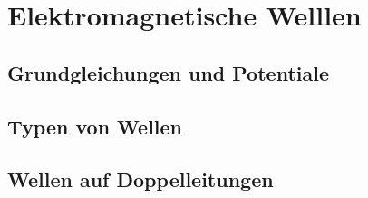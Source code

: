 	
	
	\section{Elektromagnetische Welllen}
	\subsection{Grundgleichungen und Potentiale}
	
	
	
	\subsection{Typen von Wellen}
	
	
	
	\subsection{Wellen auf Doppelleitungen}
	
	
	
